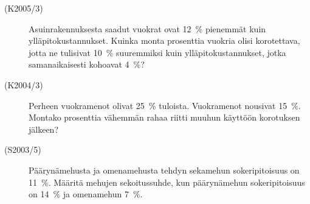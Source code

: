 \begin{description}
    \item[(K2005/3)]   Asuinrakennuksesta saadut vuokrat ovat 12~\% pienemmät kuin
                        ylläpitokustannukset. Kuinka monta prosenttia vuokria olisi
                        korotettava, jotta ne tulisivat 10~\% suuremmiksi kuin 
                        ylläpitokustannukset, jotka samanaikaisesti kohoavat 4~\%?
    \item[(K2004/3)]   Perheen vuokramenot olivat 25~\% tuloista. Vuokramenot nousivat
                        15~\%. Montako prosenttia vähemmän rahaa riitti muuhun
                        käyttöön korotuksen jälkeen?
    \item[(S2003/5)]   Päärynämehusta ja omenamehusta tehdyn sekamehun sokeripitoisuus
                        on 11~\%. Määritä mehujen sekoitussuhde, kun päärynämehun
                        sokeripitoisuus on 14~\% ja omenamehun 7~\%.


\end{description}
